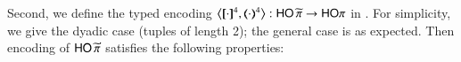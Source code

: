 \documentclass[runningheads]{llncs}
\begin{document}
{%
%

Second, we define the typed encoding
	$\enco{\map{\cdot}^{4}, \mapt{\cdot}^{4}}: \PHOp \to \HOp$ 
in .
For simplicity, we give the dyadic case (tuples of length 2);
the general case is as expected.
Then encoding of $\mathsf{HO}\,{\widetilde{\pi}}$  satisfies the following properties:



}
\end{document}
